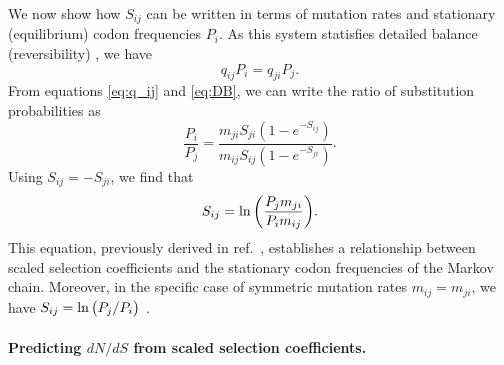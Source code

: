 \documentclass{pnastwo}
\begin{document}
\begin{article}
We now show how $S_{ij}$ can be written in terms of mutation rates and stationary (equilibrium) codon frequencies $P_i$. As this system statisfies detailed balance (reversibility) \cite{HalpernBruno1998}, we have 
\begin{equation}\label{eq:DB}
q_{ij}P_i = q_{ji}P_j .
\end{equation} From equations \eqref{eq:q_ij} and \eqref{eq:DB}, we can write the ratio of substitution probabilities as 
\begin{equation}\label{ratio_q_ij}
\frac{P_i}{P_j} = \frac{m_{ji} S_{ji} (1-e^{-S_{ij}})} {m_{ij} S_{ij} (1-e^{-S_{ji}})} .
\end{equation} Using $S_{ij} = -S_{ji}$, we find that
\begin{equation}\label{eq:s_pmu}
S_{ij} = \ln\bigg{(} \frac{P_jm_{ji}}{P_im_{ij}} \bigg{)} .
\end{equation} This equation, previously derived in ref.\ \cite{HalpernBruno1998}, establishes a relationship between scaled selection coefficients and the stationary codon frequencies of the Markov chain. Moreover, in the specific case of symmetric mutation rates $m_{ij} = m_{ji}$, we have $S_{ij} = \ln\big{(}P_j/P_i\big{)}$ \cite{SellaHirsh2005}. 


		
\paragraph{Predicting $dN/dS$ from scaled selection coefficients.} 


\end{article}
\end{document}
